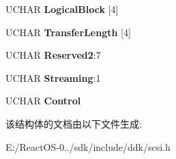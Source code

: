 \begin{DoxyCompactItemize}
U\+C\+H\+AR {\bfseries Logical\+Block} \mbox{[}4\mbox{]}
\item 
\mbox{\label{struct___c_d_b_1_1___w_r_i_t_e12_a307b22e897ecf7e008e8be3042c4ffa3}} 
U\+C\+H\+AR {\bfseries Transfer\+Length} \mbox{[}4\mbox{]}
\item 
\mbox{\label{struct___c_d_b_1_1___w_r_i_t_e12_ae4599b98ecf306003523e75dee211ea2}} 
U\+C\+H\+AR {\bfseries Reserved2}\+:7
\item 
\mbox{\label{struct___c_d_b_1_1___w_r_i_t_e12_a92d1ca27bcd7f426098ade54134c6937}} 
U\+C\+H\+AR {\bfseries Streaming}\+:1
\item 
\mbox{\label{struct___c_d_b_1_1___w_r_i_t_e12_a243c404fb55bc0c52bb3870f94cc157e}} 
U\+C\+H\+AR {\bfseries Control}
\end{DoxyCompactItemize}


该结构体的文档由以下文件生成\+:\begin{DoxyCompactItemize}
\item 
E\+:/\+React\+O\+S-\/0../sdk/include/ddk/scsi.\+h\end{DoxyCompactItemize}
